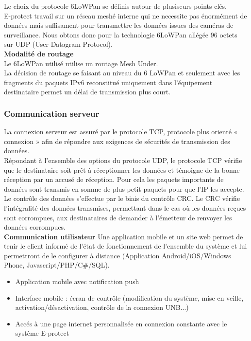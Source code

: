 Le choix du protocole 6LoWPan se définis autour de plusiseurs points clés.\\
E-protect travail sur un réseau meshé interne qui ne necessite pas énormément de données mais suffisament pour transmettre les données issues des caméras de surveillance. Nous obtons donc pour la technologie 6LoWPan allégée 96 octets sur UDP (User Datagram Protocol).\\

\textbf{Modalité de routage}\\
Le 6LoWPan utilisé utilise un routage Mesh Under.\\
La décision de routage se faisant au niveau du 6 LoWPan et seulement avec les fragments du paquets IPv6 reconstitué uniquement dans l'équipement destinataire permet un délai de transmission plus court.\cite{www:contiki}\\


\subsubsection{Communication serveur}
La connexion serveur est assuré par le protocole TCP, protocole plus orienté « connexion » afin de répondre aux exigences de sécurités de transmission des données.\\ 
Répondant à l’ensemble des options du protocole UDP, le protocole TCP vérifie que le destinataire soit prêt à réceptionner les données et témoigne de la bonne réception par un accusé de réception. Pour cela les paquets importants de données sont transmis en somme de plus petit paquets pour que l’IP les accepte.\\
Le contrôle des données s’effectue par le biais du contrôle CRC. Le CRC vérifie l’intégralité des données transmises, permettant dans le cas où les données reçues sont corrompues, aux destinataires de demander à l'émetteur de renvoyer les données corrompues.\cite{www:contiki}\\


\textbf{Communication utilisateur} %
Une application mobile et un site web permet de tenir le client informé de l'état de fonctionnement de l'ensemble du système et lui permettront de le configurer à distance (Application Android/iOS/Windows Phone, Javascript/PHP/C\#/SQL).\\
\begin{itemize}
\item Application mobile avec notification push
\item Interface mobile : écran de contrôle (modification du système, mise en veille, activation/désactivation, contrôle de la connexion UNB...)
\item Accés à une page internet personnalisée en connexion constante avec le système E-protect\\
\end{itemize}

